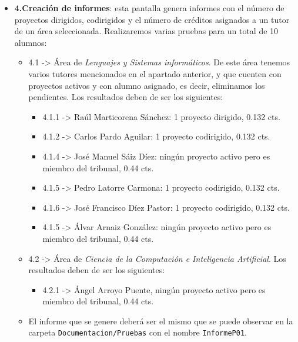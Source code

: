\begin{itemize}
	
	\item \textbf{4.Creación de informes}: esta pantalla genera informes con el número de proyectos dirigidos, codirigidos y el número de créditos asignados a un tutor de un área seleccionada. Realizaremos varias pruebas para un total de 10 alumnos:
		\begin{itemize}
			\item 4.1 -> Área de \emph{Lenguajes y Sistemas informáticos}. De este área tenemos varios tutores mencionados en el apartado anterior, y que cuenten con proyectos activos y con alumno asignado, es decir, eliminamos los pendientes. Los resultados deben de ser los siguientes:
				\begin{itemize}
					\item 4.1.1 -> Raúl Marticorena Sánchez: 1 proyecto dirigido, 0.132 cts.
					\item 4.1.2 -> Carlos Pardo Aguilar: 1 proyecto codirigido, 0.132 cts.					
					\item 4.1.4 -> José Manuel Sáiz Díez: ningún proyecto activo pero es miembro del tribunal, 0.44 cts.
					\item 4.1.5 -> Pedro Latorre Carmona: 1 proyecto codirigido, 0.132 cts.						
					\item 4.1.6 -> José Francisco Díez Pastor: 1 proyecto codirigido, 0.132 cts.										
					\item 4.1.5 -> Álvar Arnaiz González: ningún proyecto activo pero es miembro del tribunal, 0.44 cts.					
				\end{itemize}
			\item 4.2 -> Área de \emph{Ciencia de la Computación e Inteligencia Artificial}. Los resultados deben de ser los siguientes:
			\begin{itemize}
				\item 4.2.1 -> Ángel Arroyo Puente, ningún proyecto activo pero es miembro del tribunal, 0.44 cts.							
			\end{itemize}
			\item El informe que se genere deberá ser el mismo que se puede observar en la carpeta \texttt{Documentacion/Pruebas} con el nombre \texttt{InformeP01}.
		\end{itemize}


\end{itemize}

